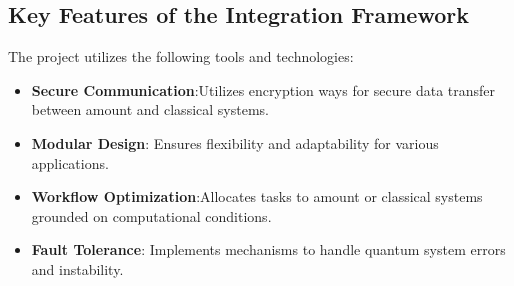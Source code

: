 \documentclass[12pt,a4paper]{article}
\begin{document}
\subsection{Key Features of the Integration Framework}
The project utilizes the following tools and technologies:
\begin{itemize}
    \item \textbf{Secure Communication}:Utilizes encryption ways for secure data transfer between amount and classical systems.
    \item \textbf{Modular Design}: Ensures flexibility and adaptability for various applications.
    \item \textbf{Workflow Optimization}:Allocates tasks to amount or classical systems grounded on computational conditions.
    \item \textbf{Fault Tolerance}: Implements mechanisms to handle quantum system errors and instability.
    
\end{itemize}
\end{document}
